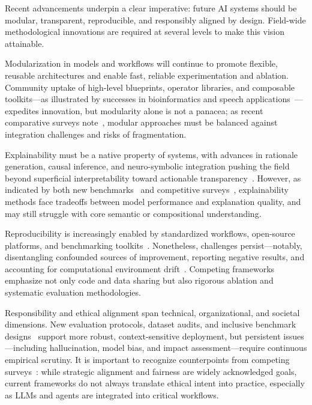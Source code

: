 \documentclass[sigconf]{acmart}
\begin{document}
Recent advancements underpin a clear imperative: future AI systems should be modular, transparent, reproducible, and responsibly aligned by design. Field-wide methodological innovations are required at several levels to make this vision attainable.

Modularization in models and workflows will continue to promote flexible, reusable architectures and enable fast, reliable experimentation and ablation. Community uptake of high-level blueprints, operator libraries, and composable toolkits---as illustrated by successes in bioinformatics and speech applications~\cite{ref78,ref86,ref87,ref98,ref100,ref101,ref102}---expedites innovation, but modularity alone is not a panacea; as recent comparative surveys note~\cite{ref55}, modular approaches must be balanced against integration challenges and risks of fragmentation.

Explainability must be a native property of systems, with advances in rationale generation, causal inference, and neuro-symbolic integration pushing the field beyond superficial interpretability toward actionable transparency~\cite{ref9,ref31,ref36,ref49,ref50,ref51,ref55,ref83,ref93}. However, as indicated by both new benchmarks~\cite{ref94,ref96,ref97} and competitive surveys~\cite{ref55}, explainability methods face tradeoffs between model performance and explanation quality, and may still struggle with core semantic or compositional understanding.

Reproducibility is increasingly enabled by standardized workflows, open-source platforms, and benchmarking toolkits~\cite{ref81,ref83,ref91,ref92,ref95,ref97,ref99,ref106,ref107,ref108}. Nonetheless, challenges persist---notably, disentangling confounded sources of improvement, reporting negative results, and accounting for computational environment drift~\cite{ref107}. Competing frameworks emphasize not only code and data sharing but also rigorous ablation and systematic evaluation methodologies.

Responsibility and ethical alignment span technical, organizational, and societal dimensions. New evaluation protocols, dataset audits, and inclusive benchmark designs~\cite{ref93,ref94,ref96,ref98,ref104,ref107,ref108} support more robust, context-sensitive deployment, but persistent issues---including hallucination, model bias, and impact assessment---require continuous empirical scrutiny. It is important to recognize counterpoints from competing surveys~\cite{ref55,ref94,ref96}: while strategic alignment and fairness are widely acknowledged goals, current frameworks do not always translate ethical intent into practice, especially as LLMs and agents are integrated into critical workflows.
\end{document}

